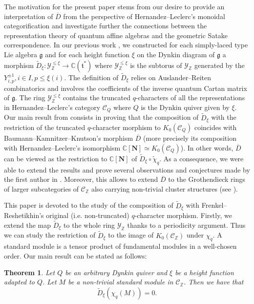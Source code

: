\documentclass[12pt]{amsart}
\theoremstyle{plain}
\newtheorem{theorem}{Theorem}[section]
\theoremstyle{definition}
\numberwithin{equation}{section}
\newcommand{\tchi}{{\widetilde{\chi}}}
\newcommand{\YZ}{\mathcal{Y}_{\mathbb{Z}}}
\newcommand{\tdxi}{\widetilde{D}_{\xi}}
\newcommand{\barD}{\overline{D}}
\newcommand{\CN}{\mathbb{C}[\mathbf{N}]}
\newcommand{\CQ}{\mathcal{C}_Q}
\newcommand{\CZ}{\mathcal{C}_{\mathbb{Z}}}
\newcommand{\YxiZ}{\mathcal{Y}_{\mathbb{Z}}^{\leq \xi}}
\begin{document}
  The motivation for the present paper stems from our desire to provide an interpretation of $\barD$ from the perspective of Hernandez--Leclerc's  monoidal categorification and investigate further the connections between the representation theory of quantum affine algebras and the geometric Satake correspondence. 
 In our previous work \cite{CasbiLi}, we constructed for each simply-laced type Lie algebra $\mathfrak{g}$ and for each height function $\xi$ on the Dynkin diagram of $\mathfrak{g}$ a morphism $\tdxi : \YxiZ \longrightarrow  \mathbb{C}(\mathfrak{t}^{*})$ where $\YxiZ$ is the subtorus of $\YZ$ generated by the $Y_{i,p}^{\pm 1}, i \in I , p \leq \xi(i)$. The definition of $\tdxi$ relies on Auslander--Reiten combinatorics and involves the coefficients of the inverse quantum Cartan matrix of $\mathfrak{g}$. The ring $\YxiZ$ contains the truncated $q$-characters of all the  representations in Hernandez--Leclerc's category $\CQ$ where $Q$ is the Dynkin quiver given by $\xi$. Our main result from \cite{CasbiLi} consists in proving that the composition of $\tdxi$ with the restriction of the truncated $q$-character morphism to $K_0(\CQ)$ coincides with Baumann--Kamnitzer--Knutson's morphism $\barD$ (more precisely its composition with Hernandez--Leclerc's isomorphism $\CN \simeq K_0(\CQ)$). In other words, $\barD$ can be viewed as the restriction to $\CN$ of $\tdxi \circ \tchi_q$. As a consequence, we were able to extend the results and prove several observations and conjectures made by the first author in \cite{Casbi3}. Moreover,  this allows to extend $\barD$ to the Grothendieck rings of larger subcategories of $\CZ$ also carrying non-trivial cluster structures (see \cite{HL16}). 

This paper is devoted to the  study of the composition of $\tdxi$ with Frenkel--Reshetikhin's original (i.e. non-truncated) $q$-character morphism. Firstly, we extend the map $\tdxi$ to the whole ring $\YZ$ thanks to a periodicity argument. Thus we can study the restriction of $\tdxi$ to the image of $K_0(\CZ)$ under $\chi_q$. A standard module is a tensor product of fundamental modules in a well-chosen order. Our main result can be stated as follows:

 \begin{theorem} \label{thm : main thm intro}
     Let $Q$ be an arbitrary Dynkin quiver and $\xi$ be a height function adapted to $Q$. Let $M$ be a non-trivial standard module in $\CZ$. Then we have that
     $$ \tdxi \left( \chi_q(M) \right) = 0. $$
\end{theorem}
\end{document}

